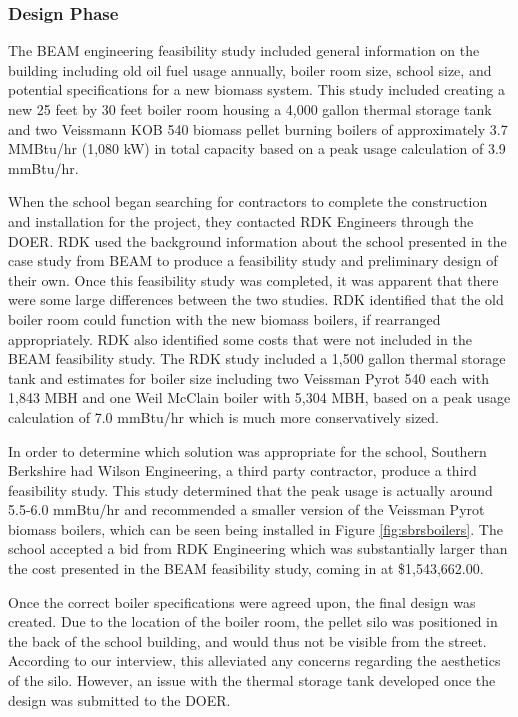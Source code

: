 \subsubsection{ Design Phase}
\par The BEAM engineering feasibility study included general information on the building including old oil fuel usage annually, boiler room size, school size, and potential specifications for a new biomass system. This study included creating a new 25 feet by 30 feet boiler room housing a 4,000 gallon thermal storage tank and two Veissmann KOB 540 biomass pellet burning  boilers of approximately 3.7 MMBtu/hr (1,080 kW) in total capacity based on a peak usage calculation of 3.9 mmBtu/hr. 
\par When the school began searching for contractors to complete the construction and installation for the project, they contacted RDK Engineers through the DOER. RDK used the background information about the school presented in the case study from BEAM to produce a feasibility study and preliminary design of their own. Once this feasibility study was completed, it was apparent that there were some large differences between the two studies. RDK identified that the old boiler room could function with the new biomass boilers, if rearranged appropriately. RDK also identified some costs that were not included in the BEAM feasibility study. The RDK study included a 1,500 gallon thermal storage tank and estimates for boiler size including two Veissman Pyrot 540 each with 1,843 MBH and one Weil McClain boiler with 5,304 MBH, based on a peak usage calculation of 7.0 mmBtu/hr which is much more conservatively sized. 
\par In order to determine which solution was appropriate for the school, Southern Berkshire had Wilson Engineering, a third party contractor, produce a third feasibility study. This study determined that the peak usage is actually around 5.5-6.0 mmBtu/hr and recommended a smaller version of the Veissman Pyrot biomass boilers, which can be seen being installed in Figure \ref{fig:sbrsboilers}. The school accepted a bid from RDK Engineering which was substantially larger than the cost presented in the BEAM feasibility study, coming in at \$1,543,662.00.
\par Once the correct boiler specifications were agreed upon, the final design was created. Due to the location of the boiler room, the pellet silo was positioned in the back of the school building, and would thus not be visible from the street. According to our interview, this alleviated any concerns regarding the aesthetics of the silo. However, an issue with the thermal storage tank developed once the design was submitted to the DOER.

